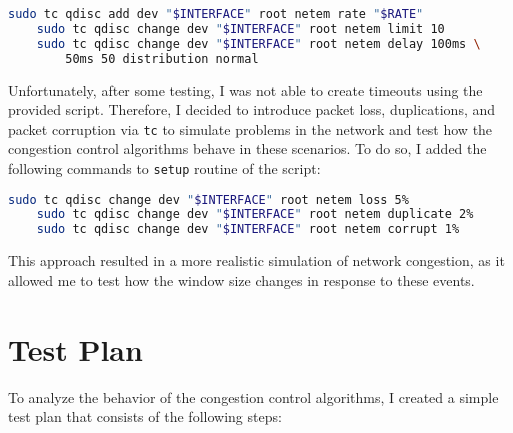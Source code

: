 \documentclass[a4paper, 11pt]{article}
\begin{document}
\begin{lstlisting}[language=bash]
	sudo tc qdisc add dev "$INTERFACE" root netem rate "$RATE"
	sudo tc qdisc change dev "$INTERFACE" root netem limit 10
	sudo tc qdisc change dev "$INTERFACE" root netem delay 100ms \
		50ms 50 distribution normal
\end{lstlisting}

Unfortunately, after some testing, I was not able to create timeouts using the provided script. Therefore, I decided to introduce packet loss, duplications, and packet corruption via \texttt{tc} to simulate problems in the network and test how the congestion control algorithms behave in these scenarios. To do so, I added the following commands to \texttt{setup} routine of the script:

\begin{lstlisting}[language=bash]
	sudo tc qdisc change dev "$INTERFACE" root netem loss 5%
	sudo tc qdisc change dev "$INTERFACE" root netem duplicate 2%
	sudo tc qdisc change dev "$INTERFACE" root netem corrupt 1%
\end{lstlisting}

This approach resulted in a more realistic simulation of network congestion, as it allowed me to test how the window size changes in response to these events.

\pagebreak

\section{Test Plan}

To analyze the behavior of the congestion control algorithms, I created a simple test plan that consists of the following steps:
\end{document}

